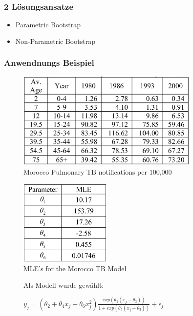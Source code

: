 \documentclass[aspectratio=1610, 9pt]{beamer}
\begin{document}
\begin{frame}
  \frametitle{2 Lösungsansatze}
  \begin{itemize}
    \item Parametric Bootstrap
    \item Non-Parametric Bootstrap
  \end{itemize}
\end{frame}

\begin{frame}
  \frametitle{Anwendnungs Beispiel}
  \begin{minipage}[t]{0.48\linewidth}
	  \begin{figure}
	    \includegraphics[width=0.8\textwidth]{images/5.png}
	    \caption{Morocco Pulmonary TB notifications per 100,000}
	  \end{figure}
  \end{minipage}
  \begin{minipage}[t]{0.48\linewidth}
	  \begin{figure}
	    \includegraphics[width=0.4\textwidth]{images/6.png}
	    \caption{MLE’s for the Morocco TB Model}
	  \end{figure}
	\end{minipage}
	\begin{figure}
	  Als Modell wurde gewählt: \\
		\begin{center}
	      $y_j = (\theta_2 + \theta_4 x_j + \theta_6 x^2_j)
			  \frac{
			    exp(\theta_5(x_j - \theta_3))}{
			    1 + exp(\theta_5(x_j - \theta_3))
			  } + \epsilon_j$	
		\end{center}
	\end{figure}
\end{frame}
\end{document}
